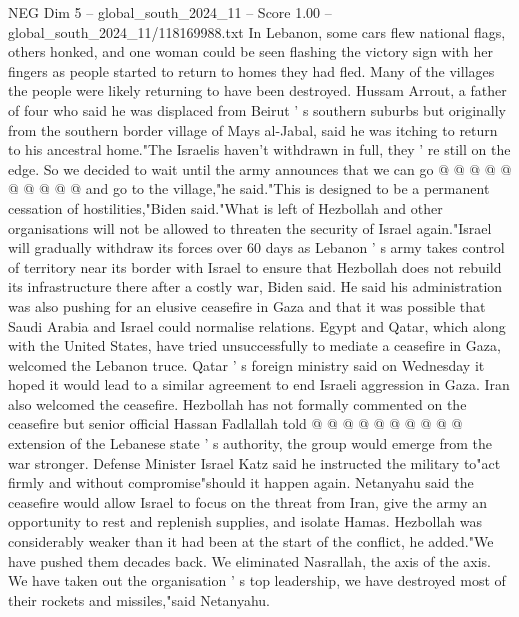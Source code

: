 \begin{textsample}{NEG Dim 5 – global\_south\_2024\_11 – Score 1.00 – global\_south\_2024\_11/118169988.txt}
In Lebanon, some cars flew national flags, others honked, and one woman could be seen flashing the victory sign with her fingers as people started to return to homes they had fled.
Many of the villages the people were likely returning to have been destroyed.
Hussam Arrout, a father of four who said he was displaced from Beirut ' s southern suburbs but originally from the southern border village of Mays al-Jabal, said he was itching to return to his ancestral home."The Israelis haven't withdrawn in full, they ' re still on the edge.
So we decided to wait until the army announces that we can go @ @ @ @ @ @ @ @ @ @ and go to the village,"he said."This is designed to be a permanent cessation of hostilities,"Biden said."What is left of Hezbollah and other organisations will not be allowed to threaten the security of Israel again."Israel will gradually withdraw its forces over 60 days as Lebanon ' s army takes control of territory near its border with Israel to ensure that Hezbollah does not rebuild its infrastructure there after a costly war, Biden said.
He said his administration was also pushing for an elusive ceasefire in Gaza and that it was possible that Saudi Arabia and Israel could normalise relations.
Egypt and Qatar, which along with the United States, have tried unsuccessfully to mediate a ceasefire in Gaza, welcomed the Lebanon truce.
Qatar ' s foreign ministry said on Wednesday it hoped it would lead to a similar agreement to end Israeli aggression in Gaza.
Iran also welcomed the ceasefire.
Hezbollah has not formally commented on the ceasefire but senior official Hassan Fadlallah told @ @ @ @ @ @ @ @ @ @ extension of the Lebanese state ' s authority, the group would emerge from the war stronger.
Defense Minister Israel Katz said he instructed the military to"act firmly and without compromise"should it happen again.
Netanyahu said the ceasefire would allow Israel to focus on the threat from Iran, give the army an opportunity to rest and replenish supplies, and isolate Hamas.
Hezbollah was considerably weaker than it had been at the start of the conflict, he added."We have pushed them decades back.
We eliminated Nasrallah, the axis of the axis.
We have taken out the organisation ' s top leadership, we have destroyed most of their rockets and missiles,"said Netanyahu.

\end{textsample}
